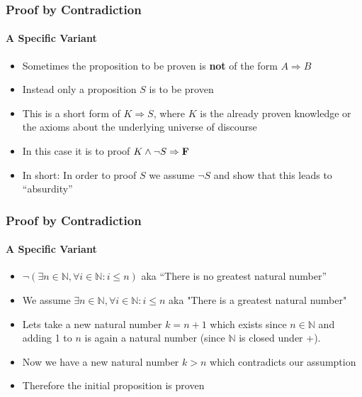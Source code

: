 \documentclass{beamer}
\theoremstyle{remark}
\begin{document}
\begin{frame}
	\frametitle{Proof by Contradiction}
	\framesubtitle{A Specific Variant}
	\begin{itemize}
		\item Sometimes the proposition to be proven is {\bf not} of the form  $A \Rightarrow B$
		\item Instead only a proposition $S$ is to be proven
		\item This is a short form of $K \Rightarrow S$, where $K$ is the already proven knowledge or the axioms about the underlying universe of discourse
		\item In this case it is to proof $K \land \lnot S \Rightarrow \text{{\bf F}}$
		\item In short: In order to proof $S$ we assume $\lnot S$ and show that this leads to ``absurdity''
	\end{itemize}
\end{frame}
\begin{frame}
	\frametitle{Proof by Contradiction}
	\framesubtitle{A Specific Variant}
	\begin{Example}
		\begin{itemize}
			\item $\lnot (\exists n \in \mathbb{N}, \forall i \in \mathbb{N}: i \leq n)$ aka ``There is no greatest natural number''
			\item We assume $\exists n \in \mathbb{N}, \forall i \in \mathbb{N}: i \leq n$ aka "There is a greatest natural number"
			\item Lets take a new natural number $k = n + 1$ which exists since $n \in \mathbb{N}$ and adding 1 to $n$ is again a natural number (since $\mathbb{N}$ is closed under +).
			\item Now we have a new natural number $k > n$ which contradicts our assumption
			\item Therefore the initial proposition is proven
		\end{itemize}
	\end{Example}

\end{frame}
\end{document}
